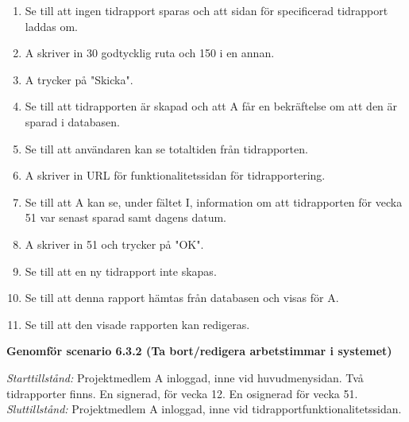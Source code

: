 \documentclass[a4paper]{article}
\begin{document}
\begin{ST}
\begin{enumerate}
\item Se till att ingen tidrapport sparas och att sidan för specificerad tidrapport laddas om.
\item A skriver in 30 godtycklig ruta och 150 i en annan.
\item A trycker på "Skicka".
\item Se till att tidrapporten är skapad och att A får en bekräftelse om att den är sparad i databasen.
\item Se till att användaren kan se totaltiden från tidrapporten.
\item A skriver in URL för funktionalitetssidan för tidrapportering.
\item Se till att A kan se, under fältet I, information om att tidrapporten för vecka 51 var senast sparad samt dagens datum.
\item A skriver in 51 och trycker på "OK".
\item Se till att en ny tidrapport inte skapas.
\item Se till att denna rapport hämtas från databasen och visas för A.
\item Se till att den visade rapporten kan redigeras.

\end{enumerate}



\item
\textbf{Genomför scenario 6.3.2 (Ta bort/redigera arbetstimmar i systemet)}

\emph{Starttillstånd:} Projektmedlem A inloggad, inne vid huvudmenysidan. Två tidrapporter finns. En signerad, för vecka 12. En osignerad för vecka 51.\\
\emph{Sluttillstånd:} Projektmedlem A inloggad, inne vid tidrapportfunktionalitetssidan.\\


\end{ST}
\end{document}
